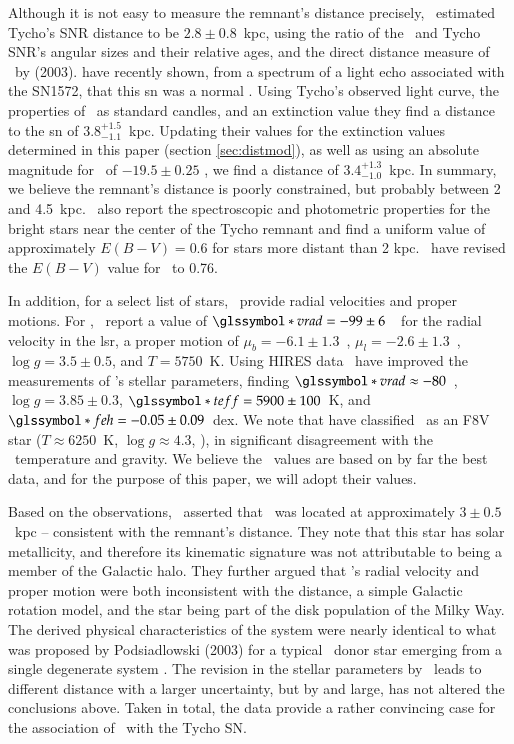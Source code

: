 Although it is not easy to measure the
remnant's distance precisely, \rl\ estimated Tycho's SNR distance to be $2.8 \pm 0.8$~kpc, using the ratio of the \ and Tycho SNR's angular sizes and their relative ages, and the direct distance measure of \ by \citeauthor*{2003ApJ...585..324W} (2003).  \citet{2008Natur.456..617K} have recently shown, from a spectrum of a light echo associated with the SN1572, that this \gls*{sn} was a normal \snia. Using Tycho's observed light curve, the properties of \snia\ as standard candles, and an extinction value they find a distance to the \gls*{sn} of $3.8^{+1.5}_{-1.1}$~kpc. Updating their values for the extinction values determined in this paper (section \ref{sec:distmod}), as well as using an absolute magnitude for \snia\ of $-19.5 \pm 0.25$ \citep{2004MNRAS.349.1344A}, we find a distance of $3.4^{+1.3}_{-1.0}$~kpc. In summary, we believe the remnant's distance is poorly constrained, but probably between 2 and 4.5~kpc.
\label{sec:obschar}
\rl\ also report the
spectroscopic and photometric properties for the bright stars near the
center of the Tycho remnant and find a uniform value of approximately
$E(B-V)=0.6$ for stars more distant than 2 kpc. \gh\ have revised the $E(B-V)$ value for \starg\ to 0.76.

In addition, for a select list of stars, \rl\ provide radial velocities and proper
motions. 
For \starg, \rl\ report a value of $\vrad=-99\pm6$~\kms\ for
the radial velocity in the \gls{lsr}, a
proper motion of $\mu_b=-6.1 \pm 1.3$~\masyr, $\mu_l=-2.6 \pm
1.3$~\masyr, $\log{g} = 3.5 \pm 0.5$, and $T=5750$~K.  Using HIRES data \gh\ have improved the measurements of \starg's stellar parameters, finding  $\vrad \approx -80$~\kms, $\log{g} = 3.85 \pm 0.3$, $\teff=5900 \pm 100$~K, and $\feh=-0.05 \pm 0.09$~dex. We note that
\citet{2007PASJ...59..811I} have classified \starg\ as an F8V star ($T
\approx 6250 $~K, $\log{g} \approx 4.3$,
\citealt{1982lbor.book.....A}), in significant disagreement with the
\rl\ temperature and gravity. We believe the \gh\  values are based on by far the best data, and for the purpose of this paper, we will adopt their values. 

Based on the observations, \rl\ asserted that \starg\ was located at
approximately $3\pm 0.5$~kpc -- consistent with the remnant's
distance.  They note that this star has solar
metallicity, and therefore its kinematic signature was not
attributable to being a member of the Galactic halo. 
They further argued that \starg's radial velocity and proper
motion were both inconsistent with the distance, a simple Galactic
rotation model, and the star being part of the disk population of the Milky Way.
 The derived physical characteristics of the system were nearly identical to
what was proposed by Podsiadlowski (2003) for a typical \snia\ donor
star emerging from a single degenerate system \citep[e.g., U Sco; also see ][]{Hachisu:1996p758,Li:1997p437,Hachisu:1999p431,Han:2004p444,Han:2008p726}. The revision in the stellar parameters by
\gh\ leads to different distance with a larger uncertainty, but by and large, has not altered the conclusions above. Taken in total, the data provide a rather convincing case for the association of \starg\ with the Tycho SN.

